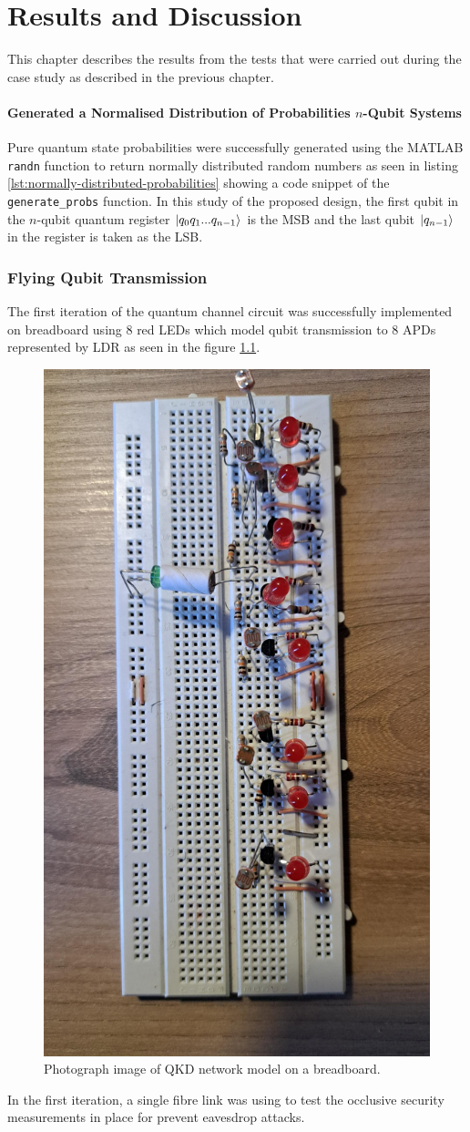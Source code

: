 \chapter{\label{ch:results} Results and Discussion}

This chapter describes the results from the tests that were carried out during the case study as described in the previous chapter. 

\subsubsection{Generated a Normalised Distribution of Probabilities $n$-Qubit Systems}

Pure quantum state probabilities were successfully generated using the MATLAB \texttt{randn} function to return normally distributed random numbers as seen in listing \ref{lst:normally-distributed-probabilities} showing a code snippet of the \texttt{generate\_probs} function. In this study of the proposed design, the first qubit in the $n$-qubit quantum register $\ket{q_0 q_1 ... q_{n-1}}$ is the MSB and the last qubit $\ket{q_{n-1}}$ in the register is taken as the LSB. 

\subsection{Flying Qubit Transmission}

The first iteration of the quantum channel circuit was successfully implemented on breadboard using 8 red LEDs which model qubit transmission to 8 APDs represented by LDR as seen in the figure \ref{fig:quantum-channel-bread}.
\begin{figure}[!ht]
	\centering
	\includegraphics[width=0.45\linewidth]{body/ch6/figs/bread}
	\caption[Diagram of First Iteration of the Quantum Channel.]{Photograph image of QKD network model on a breadboard.}
	\label{fig:quantum-channel-bread}
\end{figure}
In the first iteration, a single fibre link was using to test the occlusive security measurements in place for prevent eavesdrop attacks. 

